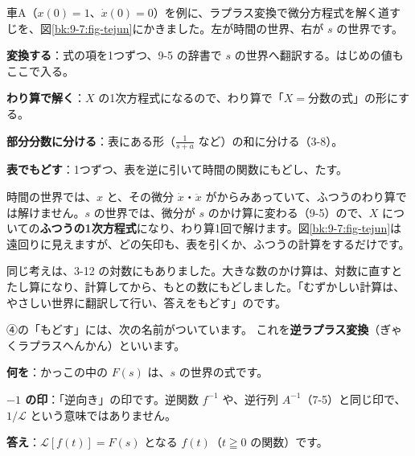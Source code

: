 車A（$x(0)=1$、$\dot x(0)=0$）を例に、ラプラス変換で微分方程式を解く道すじを、図\ref{bk:9-7:fig-tejun}にかきました。左が時間の世界、右が $s$ の世界です。

\begin{enumerate}[label={\bkcircled[\bkTT]{\arabic*}}, leftmargin=2.4\zw, itemsep=2pt, topsep=2pt]
\item \textbf{変換する}：式の項を1つずつ、9-5 の辞書で $s$ の世界へ翻訳する。はじめの値もここで入る。
\item \textbf{わり算で解く}：$X$ の1次方程式になるので、わり算で「$X=$分数の式」の形にする。
\item \textbf{部分分数に分ける}：表にある形（$\tfrac{1}{s+a}$ など）の和に分ける（3-8）。
\item \textbf{表でもどす}：1つずつ、表を逆に引いて時間の関数にもどし、たす。
\end{enumerate}

時間の世界では、$x$ と、その微分 $\dot x$・$\ddot x$ がからみあっていて、ふつうのわり算では解けません。$s$ の世界では、微分が $s$ のかけ算に変わる（9-5）ので、$X$ についての\textbf{ふつうの1次方程式}になり、わり算1回で解けます。図\ref{bk:9-7:fig-tejun}は遠回りに見えますが、どの矢印も、表を引くか、ふつうの計算をするだけです。

同じ考えは、3-12 の対数にもありました。大きな数のかけ算は、対数に直すとたし算になり、計算してから、もとの数にもどしました。「むずかしい計算は、やさしい世界に翻訳して行い、答えをもどす」のです。


\label{bk:9-7:namae}④の「もどす」には、次の名前がついています。
これを\textbf{逆ラプラス変換}（ぎゃくラプラスへんかん）といいます。

\begin{enumerate}[label={\bkcircled[\bkTT]{\arabic*}}, leftmargin=2.4\zw, itemsep=2pt, topsep=2pt]
\item \textbf{何を}：かっこの中の $F(s)$ は、$s$ の世界の式です。
\item \textbf{$-1$ の印}：「逆向き」の印です。逆関数 $f^{-1}$ や、逆行列 $A^{-1}$（7-5）と同じ印で、$1/\mathcal L$ という意味ではありません。
\item \textbf{答え}：$\mathcal L[f(t)]=F(s)$ となる $f(t)$（$t\geqq0$ の関数）です。
\end{enumerate}

